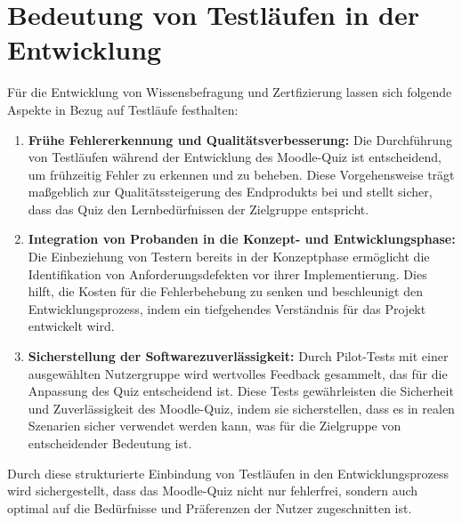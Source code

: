 \section{Bedeutung von Testläufen in der Entwicklung}
Für die Entwicklung von Wissensbefragung und Zertfizierung lassen sich folgende Aspekte in Bezug auf Testläufe festhalten:
\begin{enumerate}
    \item \textbf{Frühe Fehlererkennung und Qualitätsverbesserung:} Die Durchführung von Testläufen während der Entwicklung des Moodle-Quiz ist entscheidend, um frühzeitig Fehler zu erkennen und zu beheben. Diese Vorgehensweise trägt maßgeblich zur Qualitätssteigerung des Endprodukts bei und stellt sicher, dass das Quiz den Lernbedürfnissen der Zielgruppe entspricht.
    \item \textbf{Integration von Probanden in die Konzept- und Entwicklungsphase:} Die Einbeziehung von Testern bereits in der Konzeptphase ermöglicht die Identifikation von Anforderungsdefekten vor ihrer Implementierung. Dies hilft, die Kosten für die Fehlerbehebung zu senken und beschleunigt den Entwicklungsprozess, indem ein tiefgehendes Verständnis für das Projekt entwickelt wird.
    \item \textbf{Sicherstellung der Softwarezuverlässigkeit:} Durch Pilot-Tests mit einer ausgewählten Nutzergruppe wird wertvolles Feedback gesammelt, das für die Anpassung des Quiz entscheidend ist. Diese Tests gewährleisten die Sicherheit und Zuverlässigkeit des Moodle-Quiz, indem sie sicherstellen, dass es in realen Szenarien sicher verwendet werden kann, was für die Zielgruppe von entscheidender Bedeutung ist.
\end{enumerate}
Durch diese strukturierte Einbindung von Testläufen in den Entwicklungsprozess wird sichergestellt, dass das Moodle-Quiz nicht nur fehlerfrei, sondern
auch optimal auf die Bedürfnisse und Präferenzen der Nutzer zugeschnitten ist.